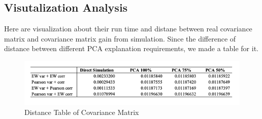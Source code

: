 \documentclass[a4paper,12pt]{article}
\begin{document}
\subsection*{Visutalization Analysis}
Here are visualization about their run time and distane between real covariance matrix and covariance matrix gain from simulation. Since the difference of distance between different PCA explanation requirements, we made a table for it.\\

\begin{figure}[!htbp]
    \includegraphics[width=15cm]{pca.png}
    \caption{Distance Table of Covariance Matrix}
\end{figure}
\end{document}
